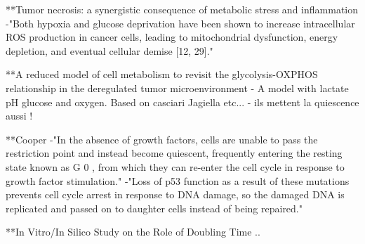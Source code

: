\documentclass[11pt,a4paper]{article}
\begin{document}
**Tumor necrosis: a synergistic consequence of metabolic stress and inflammation
-"Both hypoxia and glucose deprivation have been shown to increase intracellular ROS production in cancer cells, leading to mitochondrial dysfunction, energy depletion, and eventual cellular demise [12, 29]."

**A reduced model of cell metabolism to revisit the glycolysis-OXPHOS relationship in the deregulated tumor microenvironment
- A model with lactate pH glucose and oxygen. Based on casciari Jagiella etc...
- ils mettent la quiescence aussi !

**Cooper
-"In the absence of growth factors, cells are unable to pass the restriction point and instead become quiescent, frequently entering the resting state known as G 0 , from which they can re-enter the cell cycle in response to growth factor stimulation."
-"Loss of p53 function as a result of these mutations prevents cell cycle arrest in response to DNA damage, so the damaged DNA is replicated and passed on to daughter cells instead of being repaired."

**In Vitro/In Silico Study on the Role of Doubling Time ..
 
\end{document}
